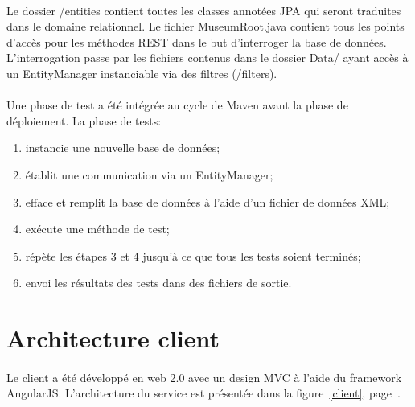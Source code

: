 \paragraph{}
Le dossier /entities contient toutes les classes annotées JPA qui seront traduites dans le domaine relationnel. Le fichier MuseumRoot.java contient tous les points d'accès pour les méthodes REST dans le but d'interroger la base de données. L'interrogation passe par les fichiers contenus dans le dossier Data/ ayant accès à un EntityManager instanciable via des filtres (/filters).

\paragraph{}
Une phase de test a été intégrée au cycle de Maven avant la phase de déploiement. La phase de tests:
\begin{enumerate}
\item instancie une nouvelle base de données;
\item établit une communication via un EntityManager;
\item efface et remplit la base de données à l'aide d'un fichier de données XML;
\item exécute une méthode de test;
\item répète les étapes 3 et 4 jusqu'à ce que tous les tests soient terminés;
\item envoi les résultats des tests dans des fichiers de sortie.
\end{enumerate}

\section{Architecture client}
\paragraph{}
Le client a été développé en web 2.0 avec un design MVC à l'aide du framework AngularJS. L'architecture du service est présentée dans la figure~\ref{client}, page~\pageref{client}.

